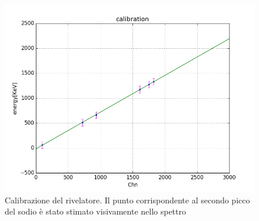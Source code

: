 \documentclass[a4paper]{article}
\begin{document}
\begin{figure}[!h]
\includegraphics[width=1\textwidth]{calibrazione}
        \caption{Calibrazione del rivelatore. Il punto corrispondente al secondo picco del sodio è stato stimato visivamente nello spettro}
        \label{fig:2}
\end{figure}
\end{document}
